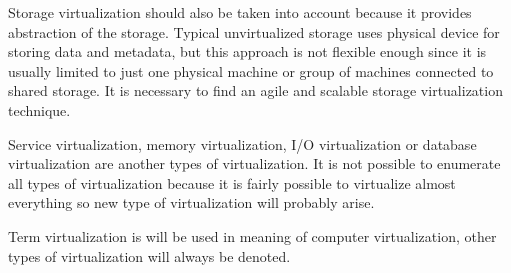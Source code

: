 Storage virtualization should also be taken into account because it provides abstraction of the storage. Typical unvirtualized storage uses physical device for storing data and metadata, but this approach is not flexible enough since it is usually limited to just one physical machine or group of machines connected to shared storage. It is necessary to find an agile and scalable storage virtualization technique.

Service virtualization, memory virtualization, I/O virtualization or database virtualization are another types of virtualization. It is not possible to enumerate all types of virtualization because it is fairly possible to virtualize almost everything so new type of virtualization will probably arise.

Term virtualization is will be used in meaning of computer virtualization, other types of virtualization will always be denoted.
